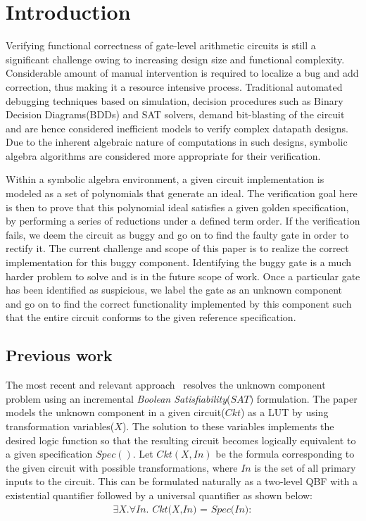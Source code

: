 \section{Introduction}
Verifying functional correctness of gate-level arithmetic circuits is still a significant challenge owing to increasing design size and functional complexity. Considerable amount of manual intervention is required to localize a bug and add correction, thus making it a resource intensive process. Traditional automated debugging techniques based on simulation, decision procedures such as Binary Decision Diagrams(BDDs)\cite{bryant:1} and SAT solvers\cite{alanmi:2006}, demand bit-blasting of the circuit and are hence considered inefficient models to verify complex datapath designs. Due to the inherent algebraic nature of computations in such designs, symbolic algebra algorithms are considered more appropriate for their verification.

Within a symbolic algebra environment, a given circuit implementation is modeled as a set of polynomials that generate an ideal. The verification goal here is then to prove that this polynomial ideal satisfies a given golden specification, by performing a series of reductions under a defined term order. If the verification fails, we deem the circuit as buggy and go on to find the faulty gate in order to rectify it. The current challenge and scope of this paper is to realize the correct implementation for this buggy component. Identifying the buggy gate is a much harder problem to solve and is in the future scope of work. Once a particular gate has been identified as suspicious, we label the gate as an unknown component and go on to find the correct functionality implemented by this component such that the entire circuit conforms to the given reference specification.
\vspace{-0.1in}
\subsection{Previous work}

The most recent and relevant approach~\cite{fujita:2015}\cite{fujita:2012} resolves the unknown component problem using an incremental \textit{Boolean Satisfiability}($SAT$) formulation. The paper models the unknown component in a given circuit($Ckt$) as a LUT by using transformation variables($X$). The solution to these variables implements the desired logic function so that the resulting circuit becomes logically equivalent to a given specification $Spec()$. Let $Ckt(X,In)$ be the formula corresponding to the given circuit with possible transformations, where $In$ is the set of all primary inputs to the circuit. This can be formulated naturally as a two-level QBF with a existential quantifier followed by a universal quantifier as shown below:
\vspace{0.1in}
\begin{align}
\exists \textit{X}.\forall \textit{In. Ckt(X,In) = Spec(In)}:    
\end{align}

